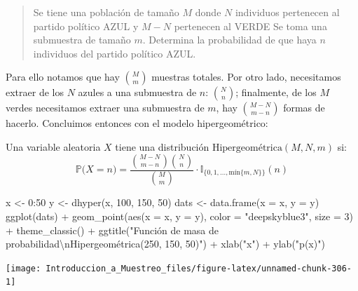 \documentclass[
]{book}
\newenvironment{Shaded}{\begin{snugshade}}{\end{snugshade}}
\newcommand{\AttributeTok}[1]{\textcolor[rgb]{0.77,0.63,0.00}{#1}}
\newcommand{\DecValTok}[1]{\textcolor[rgb]{0.00,0.00,0.81}{#1}}
\newcommand{\FunctionTok}[1]{\textcolor[rgb]{0.00,0.00,0.00}{#1}}
\newcommand{\NormalTok}[1]{#1}
\newcommand{\OtherTok}[1]{\textcolor[rgb]{0.56,0.35,0.01}{#1}}
\newcommand{\SpecialCharTok}[1]{\textcolor[rgb]{0.00,0.00,0.00}{#1}}
\newcommand{\StringTok}[1]{\textcolor[rgb]{0.31,0.60,0.02}{#1}}
\begin{document}
\begin{quote}
Se tiene una población de tamaño \(M\) donde \(N\) individuos pertenecen al partido político AZUL y \(M-N\) pertenecen al VERDE Se toma una submuestra de tamaño \(m\). Determina la probabilidad de que haya \(n\) individuos del partido político AZUL.
\end{quote}

Para ello notamos que hay \(\binom{M}{m}\) muestras totales. Por otro lado, necesitamos extraer de los \(N\) azules a una submuestra de \(n\): \(\binom{N}{n}\); finalmente, de los \(M\) verdes necesitamos extraer una submuestra de \(m\), hay \(\binom{M-N}{m-n}\) formas de hacerlo. Concluimos entonces con el modelo hipergeométrico:

Una variable aleatoria \(X\) tiene una distribución \(\text{Hipergeométrica}(M,N,m)\) si:
\[
\mathbb{P}\big(X = n \big) = \dfrac{\binom{M-N}{m-n} \binom{N}{n} }{\binom{M}{m}} \cdot \mathbb{I}_{\{0,1,\dots, \text{mín}\{m, N\} \}} (n)
\]

\begin{Shaded}
\begin{Highlighting}[]
\NormalTok{x }\OtherTok{\textless{}{-}} \DecValTok{0}\SpecialCharTok{:}\DecValTok{50}
\NormalTok{y }\OtherTok{\textless{}{-}} \FunctionTok{dhyper}\NormalTok{(x, }\DecValTok{100}\NormalTok{, }\DecValTok{150}\NormalTok{, }\DecValTok{50}\NormalTok{)}
\NormalTok{dats }\OtherTok{\textless{}{-}} \FunctionTok{data.frame}\NormalTok{(}\AttributeTok{x =}\NormalTok{ x, }\AttributeTok{y =}\NormalTok{ y)}
\FunctionTok{ggplot}\NormalTok{(dats) }\SpecialCharTok{+} \FunctionTok{geom\_point}\NormalTok{(}\FunctionTok{aes}\NormalTok{(}\AttributeTok{x =}\NormalTok{ x, }\AttributeTok{y =}\NormalTok{ y), }\AttributeTok{color =} \StringTok{"deepskyblue3"}\NormalTok{, }\AttributeTok{size =} \DecValTok{3}\NormalTok{) }\SpecialCharTok{+} \FunctionTok{theme\_classic}\NormalTok{() }\SpecialCharTok{+} \FunctionTok{ggtitle}\NormalTok{(}\StringTok{"Función de masa de probabilidad}\SpecialCharTok{\textbackslash{}n}\StringTok{Hipergeométrica(250, 150, 50)"}\NormalTok{) }\SpecialCharTok{+}
  \FunctionTok{xlab}\NormalTok{(}\StringTok{"x"}\NormalTok{) }\SpecialCharTok{+} \FunctionTok{ylab}\NormalTok{(}\StringTok{"p(x)"}\NormalTok{)}
\end{Highlighting}
\end{Shaded}

\begin{center}\texttt{[image: Introduccion\_a\_Muestreo\_files/figure-latex/unnamed-chunk-306-1]} \end{center}
\end{document}
